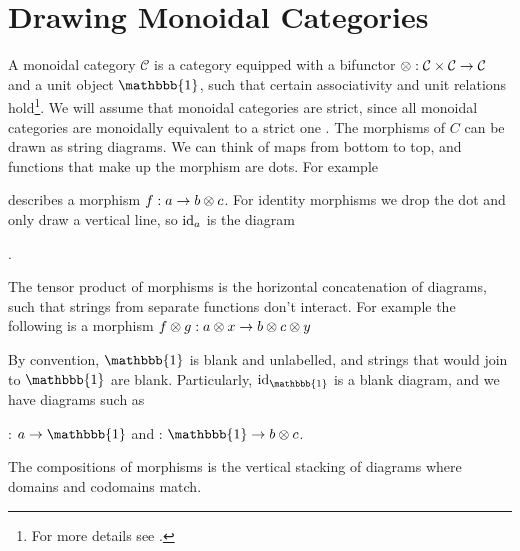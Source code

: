 \section{Drawing Monoidal Categories}

A monoidal category $\mathcal{C}$ is a category equipped with a bifunctor $\otimes: \mathcal{C} \times \mathcal{C} \to \mathcal{C}$ and a unit object $\mathbbb{1}$, such that certain associativity and unit relations hold\footnote{For more details see \cite{tensor-categories}.}. We will assume that monoidal categories are strict, since all monoidal categories are monoidally equivalent to a strict one \red{[Reference?]}. The morphisms of $C$ can be drawn as string diagrams. We can think of maps from bottom to top, and functions that make up the morphism are dots. For example
\begin{center}
\end{center}
describes a morphism $f: a \to b \otimes c$. For identity morphisms we drop the dot and only draw a vertical line, so $\operatorname{id}_a$ is the diagram
\begin{center}
    .
\end{center}
The tensor product of morphisms is the horizontal concatenation of diagrams, such that strings from separate functions don't interact. For example the following is a morphism $f \otimes g: a \otimes x \to b \otimes c \otimes y$
\begin{center}
\end{center}
By convention, $\mathbbb{1}$ is blank and unlabelled, and strings that would join to $\mathbbb{1}$ are blank. Particularly, $\id_\mathbbb{1}$ is a blank diagram, and we have diagrams such as
\begin{center}
    : $a \to \mathbbb{1}$
    \quad and \quad
    : $\mathbbb{1} \to b \tensor c$.
\end{center}
The compositions of morphisms is the vertical stacking of diagrams where domains and codomains match.







